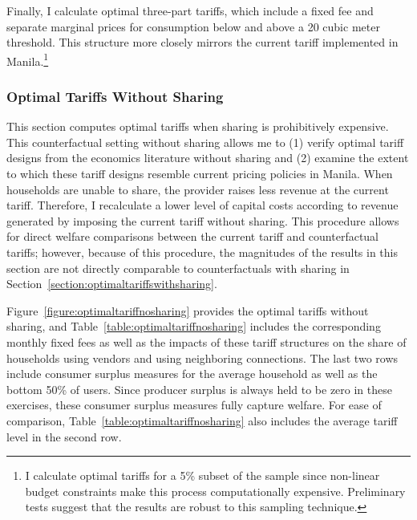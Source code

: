 \documentclass[12pt]{article}
\begin{document}
Finally, I calculate optimal three-part tariffs, which include a fixed fee and separate marginal prices for consumption below and above a 20 cubic meter threshold.  This structure more closely mirrors the current tariff implemented in Manila.\footnote{I calculate optimal tariffs for a 5\% subset of the sample since non-linear budget constraints make this process computationally expensive.  Preliminary tests suggest that the results are robust to this sampling technique.}

\subsubsection{Optimal Tariffs Without Sharing}\label{section:optimaltariffswithoutsharing}

This section computes optimal tariffs when sharing is prohibitively expensive.  This counterfactual setting without sharing allows me to (1) verify optimal tariff designs from the economics literature without sharing and (2) examine the extent to which these tariff designs resemble current pricing policies in Manila.  When households are unable to share, the provider raises less revenue at the current tariff.  Therefore, I recalculate a lower level of capital costs according to revenue generated by imposing the current tariff without sharing.  This procedure allows for direct welfare comparisons between the current tariff and counterfactual tariffs; however, because of this procedure, the magnitudes of the results in this section are not directly comparable to counterfactuals with sharing in Section~\ref{section:optimaltariffswithsharing}.

Figure~\ref{figure:optimaltariffnosharing} provides the optimal tariffs without sharing, and Table~\ref{table:optimaltariffnosharing} includes the corresponding monthly fixed fees as well as the impacts of these tariff structures on the share of households using vendors and using neighboring connections.  The last two rows include consumer surplus measures for the average household as well as the bottom 50\% of users.  Since producer surplus is always held to be zero in these exercises, these consumer surplus measures fully capture welfare.  For ease of comparison, Table~\ref{table:optimaltariffnosharing} also includes the average tariff level in the second row.
\end{document}
